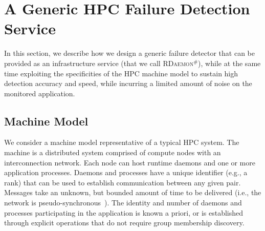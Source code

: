 \documentclass[sigconf]{acmart}
\newcommand{\ourwork}[0]{\textsc{RDaemon}\ensuremath{^\#}\xspace}
\begin{document}
%


\section{A Generic HPC Failure Detection Service}\label{sec:design}

In this section, we describe how we design a generic failure detector that can
be provided
as an infrastructure service (that we call \ourwork), while at the same time exploiting the
specificities of the HPC machine model to sustain high detection accuracy
and speed, while incurring a limited amount of noise on the monitored application.

\subsection{Machine Model}

We consider a machine model representative of a typical HPC system.
The machine is a distributed system comprised of compute nodes with an
interconnection network. Each
node can host runtime daemons and one or more application processes. Daemons
and processes have a unique identifier (e.g., a rank) that can be used
to establish communication between any given pair. Messages take an unknown,
but bounded amount of time to be delivered (i.e., the network is pseudo-synchronous~\cite{Chandra96}).
 The identity and number of daemons and processes participating in the application is known a priori,
or is established through explicit operations that do not require group
membership discovery.
\end{document}
